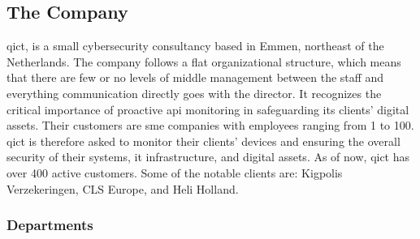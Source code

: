 \begin{multicols}{2}
      \section{The Company}

      \acrshort{qict}, is a small cybersecurity consultancy based in Emmen, northeast of the Netherlands. The company follows
      a flat organizational structure, which means that there are few or no levels of middle management between the staff and
      everything communication directly goes with the director. It recognizes the critical importance of proactive \acrshort{api}
      monitoring in safeguarding its clients' digital assets. Their customers are \acrshort{sme} companies with employees ranging
      from 1 to 100. \acrshort{qict} is therefore asked to monitor their clients' devices and ensuring the overall security of their
      systems, \acrshort{it} infrastructure, and digital assets. As of now, \acrshort{qict} has over 400 active customers. Some of
      the notable clients are: Kigpolis Verzekeringen, CLS Europe, and Heli Holland.

      \subsubsection{Departments}


\end{multicols}
